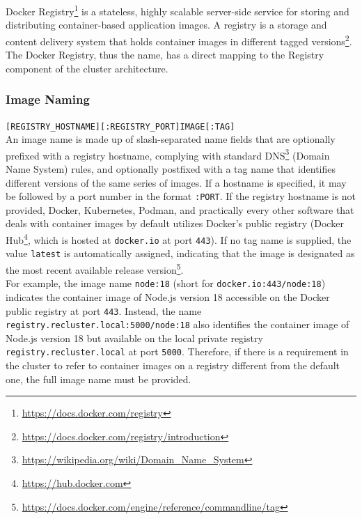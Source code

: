 Docker Registry\footnote{\url{https://docs.docker.com/registry}} is a stateless,
highly scalable server-side service for storing and distributing container-based
application images. A registry is a storage and content delivery system that
holds container images in different tagged versions\footnote{\url{https://docs.docker.com/registry/introduction}}.
\\ %
The Docker Registry, thus the name, has a direct mapping to the Registry
component of the cluster architecture.

\subsubsection{Image Naming}
\label{subsubsec:implementation_dependencies_docker_registry_image_naming}

\texttt{[REGISTRY\_HOSTNAME][:REGISTRY\_PORT]IMAGE[:TAG]} \\ %
An image name is made up of slash-separated name fields that are optionally
prefixed with a registry hostname, complying with standard DNS\footnote{\url{https://wikipedia.org/wiki/Domain_Name_System}}
(Domain Name System) rules, and optionally postfixed with a tag name that
identifies different versions of the same series of images. If a hostname is specified,
it may be followed by a port number in the format \texttt{:PORT}. If the registry
hostname is not provided, Docker, Kubernetes, Podman, and practically every other
software that deals with container images by default utilizes Docker's public registry
(Docker Hub\footnote{\url{https://hub.docker.com}}, which is hosted at \texttt{docker.io}
at port \texttt{443}). If no tag name is supplied, the value \texttt{latest} is automatically
assigned, indicating that the image is designated as the most recent available
release version\footnote{\url{https://docs.docker.com/engine/reference/commandline/tag}}.
\\ %
For example, the image name \texttt{node:18} (short for \texttt{docker.io:443/node:18})
indicates the container image of Node.js version 18 accessible on the Docker public
registry at port \texttt{443}. Instead, the name \texttt{registry.recluster.local:5000/node:18}
also identifies the container image of Node.js version 18 but available on the local
private registry \texttt{registry.recluster.local} at port \texttt{5000}.
Therefore, if there is a requirement in the cluster to refer to container images
on a registry different from the default one, the full image name must be
provided.

